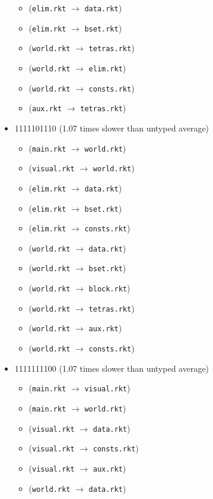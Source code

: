 \documentclass{article}
\newcommand{\mono}[1]{\texttt{#1}}
\begin{document}
\begin{itemize}
\begin{itemize}
  \item (\mono{elim.rkt} $\rightarrow$ \mono{data.rkt})
  \item (\mono{elim.rkt} $\rightarrow$ \mono{bset.rkt})
  \item (\mono{world.rkt} $\rightarrow$ \mono{tetras.rkt})
  \item (\mono{world.rkt} $\rightarrow$ \mono{elim.rkt})
  \item (\mono{world.rkt} $\rightarrow$ \mono{consts.rkt})
  \item (\mono{aux.rkt} $\rightarrow$ \mono{tetras.rkt})
  \end{itemize}
\item 1111101110 (1.07 times slower than untyped average)
  \begin{itemize}
  \item (\mono{main.rkt} $\rightarrow$ \mono{world.rkt})
  \item (\mono{visual.rkt} $\rightarrow$ \mono{world.rkt})
  \item (\mono{elim.rkt} $\rightarrow$ \mono{data.rkt})
  \item (\mono{elim.rkt} $\rightarrow$ \mono{bset.rkt})
  \item (\mono{elim.rkt} $\rightarrow$ \mono{consts.rkt})
  \item (\mono{world.rkt} $\rightarrow$ \mono{data.rkt})
  \item (\mono{world.rkt} $\rightarrow$ \mono{bset.rkt})
  \item (\mono{world.rkt} $\rightarrow$ \mono{block.rkt})
  \item (\mono{world.rkt} $\rightarrow$ \mono{tetras.rkt})
  \item (\mono{world.rkt} $\rightarrow$ \mono{aux.rkt})
  \item (\mono{world.rkt} $\rightarrow$ \mono{consts.rkt})
  \end{itemize}
\item 1111111100 (1.07 times slower than untyped average)
  \begin{itemize}
  \item (\mono{main.rkt} $\rightarrow$ \mono{visual.rkt})
  \item (\mono{main.rkt} $\rightarrow$ \mono{world.rkt})
  \item (\mono{visual.rkt} $\rightarrow$ \mono{data.rkt})
  \item (\mono{visual.rkt} $\rightarrow$ \mono{consts.rkt})
  \item (\mono{visual.rkt} $\rightarrow$ \mono{aux.rkt})
  \item (\mono{world.rkt} $\rightarrow$ \mono{data.rkt})

\end{itemize}
\end{itemize}
\end{document}
